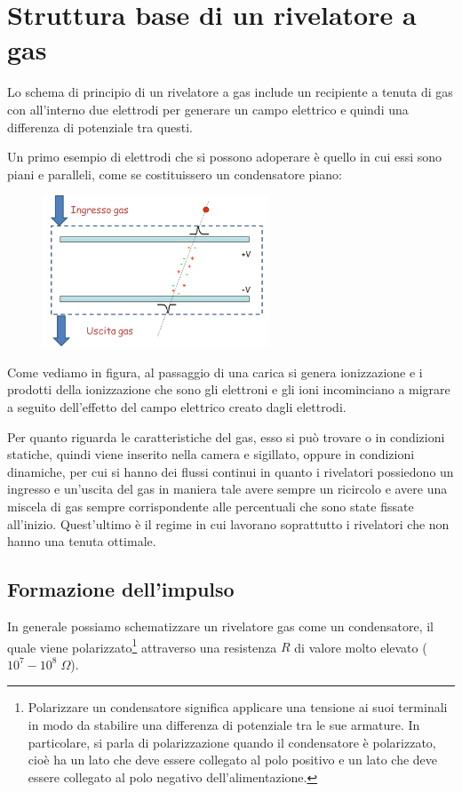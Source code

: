 \newpage

\section{Struttura base di un rivelatore a gas}
Lo schema di principio di un rivelatore a gas include un recipiente a tenuta di gas con all'interno due
elettrodi per generare un campo elettrico e quindi una differenza di potenziale tra questi.

Un primo esempio di elettrodi che si possono adoperare è quello in cui essi sono piani e paralleli, come se costituissero un condensatore piano:

\begin{figure}[H]
   \centering
   \includegraphics[width=0.6\textwidth]{immagini/modello_riv_gas_condensatore.png}
\end{figure}

Come vediamo in figura, al passaggio di una carica si genera ionizzazione e i prodotti della ionizzazione che sono gli elettroni e gli ioni incominciano a migrare a seguito dell'effetto del campo elettrico creato dagli elettrodi.

Per quanto riguarda le caratteristiche del gas, esso si può trovare o in condizioni statiche, quindi viene inserito nella camera e sigillato, oppure in condizioni dinamiche, per cui si hanno dei flussi continui in quanto i rivelatori possiedono un ingresso e un'uscita del gas in maniera tale avere sempre un ricircolo e avere una miscela di gas sempre corrispondente alle percentuali che sono state fissate all'inizio. Quest'ultimo è il regime in cui lavorano soprattutto i rivelatori che non hanno una tenuta ottimale.

\subsection{Formazione dell'impulso}
In generale possiamo schematizzare un rivelatore gas come un condensatore, il quale viene polarizzato\footnote{Polarizzare un condensatore significa applicare una tensione ai suoi terminali in modo da stabilire una differenza di potenziale tra le sue armature. In particolare, si parla di polarizzazione quando il condensatore è polarizzato, cioè ha un lato che deve essere collegato al polo positivo e un lato che deve essere collegato al polo negativo dell'alimentazione.} attraverso una resistenza $R$ di valore molto elevato ($10^7-10^8 \; \Omega$).

